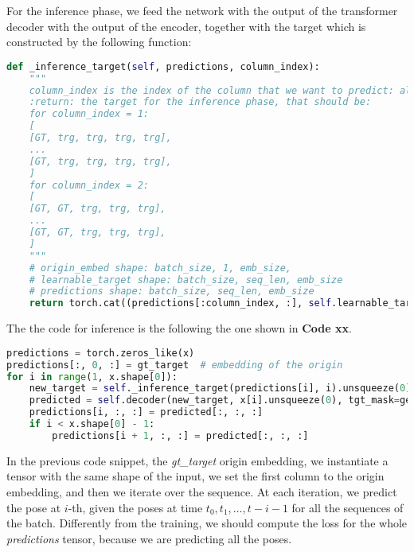 For the inference phase, we feed the network with the output of the transformer decoder with the output of the encoder, together with the target which is constructed by the following function:
\begin{lstlisting}[label={lst:lst-inference-target}, caption={Inference target}, language=Python]
def _inference_target(self, predictions, column_index):
    """
    column_index is the index of the column that we want to predict: always 0 < x < seq_len
    :return: the target for the inference phase, that should be:
    for column_index = 1:
    [
    [GT, trg, trg, trg, trg],
    ...
    [GT, trg, trg, trg, trg],
    ]
    for column_index = 2:
    [
    [GT, GT, trg, trg, trg],
    ...
    [GT, GT, trg, trg, trg],
    ]
    """
    # origin_embed shape: batch_size, 1, emb_size,
    # learnable_target shape: batch_size, seq_len, emb_size
    # predictions shape: batch_size, seq_len, emb_size
    return torch.cat((predictions[:column_index, :], self.learnable_target[column_index:, :]), dim=0)
\end{lstlisting}

The the code for inference is the following the one shown in \textbf{Code xx}.
\begin{lstlisting}[label={lst:lst-inference}, caption={Inference}, language=Python]
predictions = torch.zeros_like(x)
predictions[:, 0, :] = gt_target  # embedding of the origin
for i in range(1, x.shape[0]):
    new_target = self._inference_target(predictions[i], i).unsqueeze(0)
    predicted = self.decoder(new_target, x[i].unsqueeze(0), tgt_mask=generate_upper_triangular_mask(x.shape).to(self.device))
    predictions[i, :, :] = predicted[:, :, :]
    if i < x.shape[0] - 1:
        predictions[i + 1, :, :] = predicted[:, :, :]
\end{lstlisting}
In the previous code snippet, the \textit{gt\_target} origin embedding, we instantiate a tensor with the same shape of the input, we set the first column to the origin embedding, and then we iterate over the sequence.
At each iteration, we predict the pose at $i$-th, given the poses at time $t_0, t_1, \dots, t-i-1$ for all the sequences of the batch.
Differently from the training, we should compute the loss for the whole \textit{predictions} tensor, because we are predicting all the poses.
